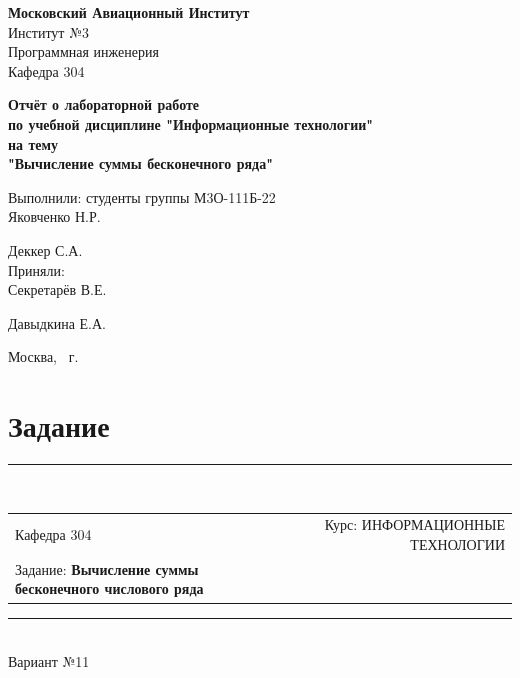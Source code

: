 \documentclass[a4paper]{article}
\begin{document}
	\def\contentsname{Содержание}
	
	\begin{titlepage}
		\begin{center}
			\textbf{Московский Авиационный Институт\\[10mm]}
				Институт №3 \\
				Программная инженерия \\
				Кафедра 304 \\
			
			\vfill
			
			\textbf{Отчёт о лабораторной работе \\ 
				по учебной дисциплине "Информационные технологии" \\
				на тему \\
				"Вычисление суммы бесконечного ряда" \\ [50mm]
			}
		\end{center}
		
		\hfill
		\begin{minipage}{.5\textwidth}
			Выполнили: студенты группы М3О-111Б-22 \\ [2mm] 
			Яковченко Н.Р.
			
			Деккер С.А. \\ [3mm]
			
			Приняли: \\ [2mm]
			Секретарёв В.Е.
			
			Давыдкина Е.А.
			
		\end{minipage}%
		\vfill
		\begin{center}
			Москва, \the\year\ г.
		\end{center}
	\end{titlepage}
	
	\tableofcontents
	\newpage
	
	\section{Задание}
	
	\begin{center}
	\rule{\textwidth}{1pt} \\[2mm]
		\begin{tabular}{ lllll }
			\multicolumn{1}{l}{Кафедра 304} & \multicolumn{4}{r}{Курс: ИНФОРМАЦИОННЫЕ ТЕХНОЛОГИИ} \\[2mm]
			\multicolumn{3}{l}{Задание: \textbf{Вычисление суммы бесконечного числового ряда}} & & \\[2mm]
		\end{tabular}
	\rule{\textwidth}{1pt} \\[2mm]
	Вариант №11
	\end{center}
	
\end{document}
